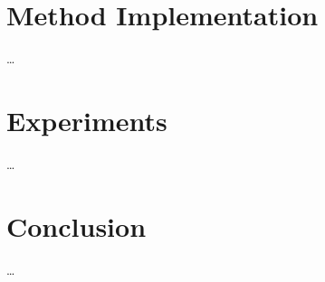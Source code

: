 \documentclass{article}
\begin{document}
{
    \section{Method Implementation}
    \label{sec:method-implementation}

    …
}

{
    \section{Experiments}
    \label{sec:experiments}

    …
}

{
    \section{Conclusion}
    \label{sec:conclusion}

    …
}

{
    
}
\end{document}
